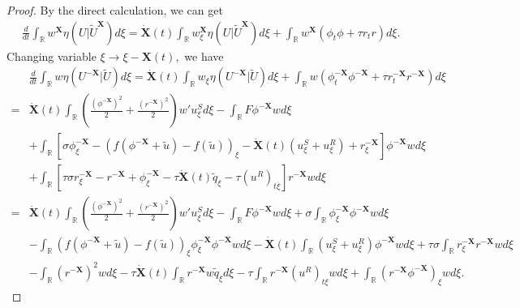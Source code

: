 \documentclass[10pt,reqno]{amsart}
\numberwithin{equation}{section}
\begin{document}
	\begin{proof}
		By the direct calculation, we can get
		\begin{align*}
			\frac{d}{dt} \int_{\mathbb{R}} w^{\mathbf{X}} \eta(U|\tilde{U}^{\mathbf{X}}) d\xi=\dot{\mathbf{X}}(t)\int_{\mathbb{R}}w_{\xi}^{{\mathbf{X}}}\eta\left(U|\tilde{U}^{\mathbf{X}}\right)d\xi+\int_{\mathbb{R}}w^{\mathbf{X}}\left(\phi_{t}\phi+\tau r_{t}r\right)d\xi.
		\end{align*}	
		Changing variable $\xi\to\xi-\mathbf{X}(t), $ we have
		\small
		\begin{align*}
			&\frac{d}{dt} \int_{\mathbb{R}} w \eta(U^{-\mathbf{X}}|\tilde{U}) d\xi
			=\dot{\mathbf{X}}(t)\int_{\mathbb{R}}w_{\xi}\eta\left(U^{-\mathbf{X}}|\tilde{U}\right)d\xi+\int_{\mathbb{R}}w\left(\phi_{t}^{-\mathbf{X}}\phi^{-\mathbf{X}}+\tau r_{t}^{-\mathbf{X}}r^{-\mathbf{X}}\right)d\xi\\
			=&\dot{\mathbf{X}}(t)\int_{\mathbb{R}}\left(\frac{\left(\phi^{-\mathbf{X}}\right)^{2}}{2}+\frac{\left(r^{-\mathbf{X}}\right)^{2}}{2}\right)w'u_{\xi}^{S}d\xi-\int_{\mathbb{R}}F\phi^{-\mathbf{X}}wd\xi\\
			&+\int_{\mathbb{R}}\left[\sigma \phi_{\xi}^{-\mathbf{X}}-\left(f\left(\phi^{-\mathbf{X}}+\tilde{u}\right)-f\left(\tilde{u}\right)\right)_{\xi}-\dot{\mathbf{X}}(t)\left(u_{\xi}^{S}+u_{\xi}^{R}\right)+r_{\xi}^{-\mathbf{X}}\right]\phi^{-\mathbf{X}} wd\xi\\
			&+\int_{\mathbb{R}}\left[\tau\sigma r_{\xi}^{-\mathbf{X}}-r^{-\mathbf{X}}+\phi_{\xi}^{-\mathbf{X}}-\tau \dot{\mathbf{X}}(t) \tilde{q}_{\xi}-\tau \left(u^{R}\right)_{t\xi}\right]r^{-\mathbf{X}}wd\xi\\
			=&\dot{\mathbf{X}}(t)\int_{\mathbb{R}}\left(\frac{\left(\phi^{-\mathbf{X}}\right)^{2}}{2}+\frac{\left(r^{-\mathbf{X}}\right)^{2}}{2}\right)w'u_{\xi}^{S}d\xi-\int_{\mathbb{R}}F\phi^{-\mathbf{X}}wd\xi+\sigma\int_{\mathbb{R}}\phi_{\xi}^{-\mathbf{X}}\phi^{-\mathbf{X}}wd\xi\\
			&-\int_{\mathbb{R}}\left(f\left(\phi^{-\mathbf{X}}+\tilde{u}\right)-f\left(\tilde{u}\right)\right)_{\xi}\phi_{\xi}^{-\mathbf{X}}\phi^{-\mathbf{X}}wd\xi-\dot{{\mathbf{X}}}(t)\int_{\mathbb{R}}\left(u_{\xi}^{S}+u_{\xi}^{R}\right)\phi^{-\mathbf{X}}wd\xi+\tau\sigma\int_{\mathbb{R}}r_{\xi}^{-\mathbf{X}}r^{-\mathbf{X}}wd\xi\\
			&-\int_{\mathbb{R}}\left(r^{-\mathbf{X}}\right)^2wd\xi-\tau\dot{\mathbf{X}}(t)\int_{\mathbb{R}}r^{-\mathbf{X}}w\tilde{q}_{\xi}d\xi-\tau\int_{\mathbb{R}}r^{-\mathbf{X}}\left(u^{R}\right)_{t\xi}wd\xi+\int_{\mathbb{R}}\left(r^{-\mathbf{X}}\phi^{-\mathbf{X}}\right)_{\xi}wd\xi.

\end{align*}
\end{proof}
\end{document}
